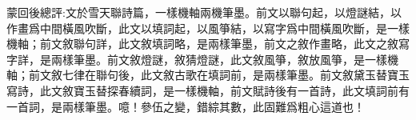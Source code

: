 \begin{parag}
    \begin{note}蒙回後總評:文於雪天聯詩篇，一樣機軸兩機筆墨。前文以聯句起，以燈謎結，以作畫爲中間橫風吹斷，此文以填詞起，以風箏結，以寫字爲中間橫風吹斷，是一樣機軸；前文敘聯句詳，此文敘填詞略，是兩樣筆墨，前文之敘作畫略，此文之敘寫字詳，是兩樣筆墨。前文敘燈謎，敘猜燈謎，此文敘風箏，敘放風箏，是一樣機軸；前文敘七律在聯句後，此文敘古歌在填詞前，是兩樣筆墨。前文敘黛玉替寶玉寫詩，此文敘寶玉替探春續詞，是一樣機軸，前文賦詩後有一首詩，此文填詞前有一首詞，是兩樣筆墨。噫！參伍之變，錯綜其數，此固難爲粗心這道也！\end{note}
\end{parag}
